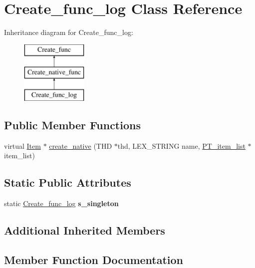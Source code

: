 \hypertarget{classCreate__func__log}{}\section{Create\+\_\+func\+\_\+log Class Reference}
\label{classCreate__func__log}
Inheritance diagram for Create\+\_\+func\+\_\+log\+:\begin{figure}[H]
\begin{center}
\leavevmode
\includegraphics[height=3.000000cm]{classCreate__func__log}
\end{center}
\end{figure}
\subsection*{Public Member Functions}
\begin{DoxyCompactItemize}
\item 
virtual \mbox{\hyperlink{classItem}{Item}} $\ast$ \mbox{\hyperlink{classCreate__func__log_a2e3f17df14bf2be60aaecebff6f5e9fb}{create\+\_\+native}} (T\+HD $\ast$thd, L\+E\+X\+\_\+\+S\+T\+R\+I\+NG name, \mbox{\hyperlink{classPT__item__list}{P\+T\+\_\+item\+\_\+list}} $\ast$item\+\_\+list)
\end{DoxyCompactItemize}
\subsection*{Static Public Attributes}
\begin{DoxyCompactItemize}
\item 
\mbox{\label{classCreate__func__log_a1c00589f38dfc217633fc8ee33bdeffe}} 
static \mbox{\hyperlink{classCreate__func__log}{Create\+\_\+func\+\_\+log}} {\bfseries s\+\_\+singleton}
\end{DoxyCompactItemize}
\subsection*{Additional Inherited Members}


\subsection{Member Function Documentation}
\mbox{\label{classCreate__func__log_a2e3f17df14bf2be60aaecebff6f5e9fb}} 
